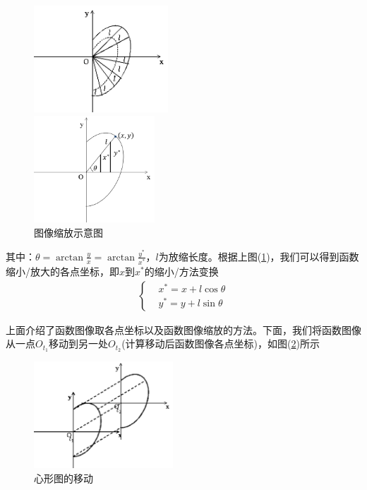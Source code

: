            \begin{figure}[H]
              \centering
              \begin{varwidth}[t]{\textwidth}
                \vspace{0pt}
                \includegraphics[height=4cm]{images/1.jpg}
              \end{varwidth}
              \qquad
              \begin{varwidth}[t]{\textwidth}
                \vspace{0pt}
                \includegraphics[height=4cm]{images/2.jpg}
              \end{varwidth}
            \caption{图像缩放示意图}
            \label{fig:图像缩放示意图}
            \end{figure}
            \noindent 其中：$\theta = \arctan\frac yx = \arctan \frac{y^*}{x^*}$，$l$为放缩长度。根据上图(\ref{fig:图像缩放示意图})，我们可以得到函数缩小/放大的各点坐标，即$x$到$x^*$的缩小/方法变换
            \begin{align*}
            \left\{
            \begin{aligned}
            & x^*=x + l\cos\theta\\
            & y^*=y + l\sin\theta
            \end{aligned}
            \right.
            \end{align*}
            \par
            上面介绍了函数图像取各点坐标以及函数图像缩放的方法。下面，我们将函数图像从一点$O_{t_1}$移动到另一处$O_{t_2}$(计算移动后函数图像各点坐标)，如图(\ref{fig:心形图的移动})所示
            \begin{figure}[H]
            \centering
            \includegraphics[height=4cm]{images/3.jpg}
            \caption{心形图的移动}
            \label{fig:心形图的移动}
            \end{figure}
